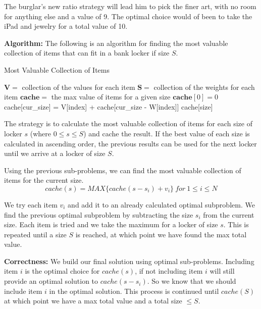 \documentclass[11pt]{article}
\newcommand\algorith{\vspace{.10in}\textbf{Algorithm: }}
\newcommand\correctness{\vspace{.10in}\textbf{Correctness: }}
\begin{document}
The burglar's new ratio strategy will lead him to pick the finer art, with no room for anything else and a value of 9. The optimal choice would of been to take the iPad and jewelry for a total value of 10.

\algorith The following is an algorithm for finding the most valuable collection of items that can fit in a bank locker if size $S$.

\begin{algorithm}[H]
\caption{Most Valuable Collection of Items}
\label{CHalgorithm}
\begin{algorithmic}[1]
\Variables
\State $\mathbf{V} = $ collection of the values for each item
\State $\mathbf{S} =$ collection of the weights for each item
\State $\mathbf{cache} =$ the max value of items for a given size
\State $\mathbf{cache}[0] = 0$
\EndVariables
\State
{}
				\State cache[cur\_size] = V[index] + cache[cur\_size - W[index]]
			\EndIf
		\EndIf
	\EndFor
\EndFor
\State
\State \Return cache[size]
\EndProcedure
\end{algorithmic}
\end{algorithm}

The strategy is to calculate the most valuable collection of items for each size of locker $s$ (where $0 \leq s \leq S$) and cache the result. If the best value of each size is calculated in ascending order, the previous results can be used for the next locker until we arrive at a locker of size $S$.

Using the previous sub-problems, we can find the most valuable collection of items for the current size.
$$cache(s) = MAX\{cache(s - s_i) + v_i\} \ for \ 1 \leq i \leq N$$

We try each item $v_i$ and add it to an already calculated optimal subproblem. We find the previous optimal subproblem by subtracting the size $s_i$ from the current size. Each item is tried and we take the maximum for a locker of size $s$. This is repeated until a size $S$ is reached, at which point we have found the max total value.

\correctness We build our final solution using optimal sub-problems. Including item $i$ is the optimal choice for $cache(s)$, if not including item $i$ will still provide an optimal solution to $cache(s - s_i)$. So we know that we should include item $i$ in the optimal solution. This process is continued until $cache(S)$ at which point we have a max total value and a total size $\leq S$.
\end{document}
